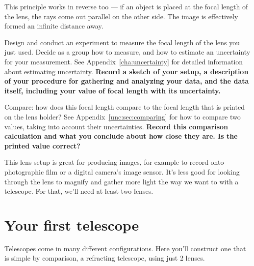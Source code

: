 This principle works in reverse too --- if an object is placed at the focal length of the lens, the rays come out parallel on the other side. The image is effectively formed an infinite distance away.

\begin{steps}
	\item Design and conduct an experiment to measure the focal length of the lens you just used. Decide as a group how to measure, and how to estimate an uncertainty for your measurement. See Appendix\ \ref{cha:uncertainty} for detailed information about estimating uncertainty. \textbf{Record a sketch of your setup, a description of your procedure for gathering and analyzing your data, and the data itself, including your value of focal length with its uncertainty.}

	\item Compare: how does this focal length compare to the focal length that is printed on the lens holder? See Appendix\ \ref{unc:sec:comparing} for how to compare two values, taking into account their uncertainties. \textbf{Record this comparison calculation and what you conclude about how close they are. Is the printed value correct?}
\end{steps}

This lens setup is great for producing images, for example to record onto photographic film or a digital camera's image sensor. It's less good for looking through the lens to magnify and gather more light the way we want to with a telescope. For that, we'll need at least two lenses.

\section{Your first telescope}

Telescopes come in many different configurations. Here you'll construct one that is simple by comparison, a refracting telescope, using just 2 lenses.

